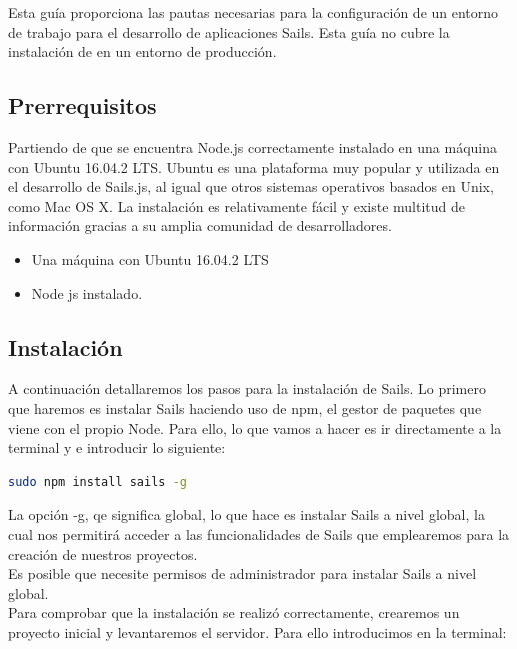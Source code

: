 Esta guía proporciona las pautas necesarias para la configuración de un entorno de trabajo para el desarrollo de aplicaciones Sails. Esta guía no cubre la instalación de en un entorno de producción.\\

\subsection{Prerrequisitos}

Partiendo de que se encuentra Node.js correctamente instalado en una máquina con Ubuntu 16.04.2 LTS. Ubuntu es una plataforma muy popular y utilizada en el desarrollo de Sails.js, al igual que otros sistemas operativos basados en Unix, como Mac OS X. La instalación es relativamente fácil y existe multitud de información gracias a su amplia comunidad de desarrolladores.\\

\begin{itemize}

\item{Una máquina con Ubuntu 16.04.2 LTS }
\item{Node js instalado.}


\end{itemize}

\subsection{Instalación}

A continuación detallaremos los pasos para la instalación de Sails. Lo primero que haremos es instalar Sails haciendo uso de npm, el gestor de paquetes que viene con el propio Node. Para ello, lo que vamos a hacer es ir directamente a la terminal y e introducir lo siguiente:\\

\begin{lstlisting}[language=bash]
sudo npm install sails -g
\end{lstlisting}

La opción -g, qe significa global, lo que hace es instalar Sails a nivel global, la cual nos permitirá acceder a las funcionalidades de Sails que emplearemos para la creación de nuestros proyectos.\\

Es posible que necesite permisos de administrador para instalar Sails a nivel global.\\

Para comprobar que la instalación se realizó correctamente, crearemos un proyecto inicial y levantaremos el servidor. Para ello introducimos en la terminal:\\

